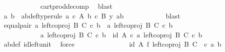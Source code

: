 \begin{isabellebody}
\ \ \ \ \ \ \ \ \ \ \isamarkupfalse%
\ cart{\isacharunderscore}{\kern0pt}prod{\isacharunderscore}{\kern0pt}decomp\ \isamarkupfalse%
\ blast\isanewline
\ \ \ \ \ \ \ \ \isamarkupfalse%
\ \isamarkupfalse%
\ a{\isacharprime}{\kern0pt}\ b{\isacharprime}{\kern0pt}\ \ a{\isacharprime}{\kern0pt}b{\isacharprime}{\kern0pt}{\isacharunderscore}{\kern0pt}def{\isacharbrackleft}{\kern0pt}type{\isacharunderscore}{\kern0pt}rule{\isacharbrackright}{\kern0pt}{\isacharcolon}{\kern0pt}\ {\isachardoublequoteopen}a{\isacharprime}{\kern0pt}\ {\isasymin}\isactrlsub c\ A{\isachardoublequoteclose}\ {\isachardoublequoteopen}b{\isacharprime}{\kern0pt}\ {\isasymin}\isactrlsub c\ B{\isachardoublequoteclose}\ {\isachardoublequoteopen}y{\isacharprime}{\kern0pt}\ {\isacharequal}{\kern0pt}{\isasymlangle}a{\isacharprime}{\kern0pt}{\isacharcomma}{\kern0pt}b{\isacharprime}{\kern0pt}{\isasymrangle}{\isachardoublequoteclose}\isanewline
\ \ \ \ \ \ \ \ \ \ \isamarkupfalse%
\ blast\isanewline
\ \ \ \ \ \ \ \ \isamarkupfalse%
\ equal{\isacharunderscore}{\kern0pt}pair{\isacharcolon}{\kern0pt}\ {\isachardoublequoteopen}{\isasymlangle}a{\isacharcomma}{\kern0pt}\ left{\isacharunderscore}{\kern0pt}coproj\ B\ C\ {\isasymcirc}\isactrlsub c\ b{\isasymrangle}\ {\isacharequal}{\kern0pt}\ {\isasymlangle}a{\isacharprime}{\kern0pt}{\isacharcomma}{\kern0pt}\ left{\isacharunderscore}{\kern0pt}coproj\ B\ C\ {\isasymcirc}\isactrlsub c\ b{\isacharprime}{\kern0pt}{\isasymrangle}{\isachardoublequoteclose}\isanewline
\ \ \ \ \ \ \ \ \isamarkupfalse%
\ {\isacharminus}{\kern0pt}\ \isanewline
\ \ \ \ \ \ \ \ \ \ \isamarkupfalse%
\ {\isachardoublequoteopen}{\isasymlangle}a{\isacharcomma}{\kern0pt}\ left{\isacharunderscore}{\kern0pt}coproj\ B\ C\ {\isasymcirc}\isactrlsub c\ b{\isasymrangle}\ {\isacharequal}{\kern0pt}\ {\isasymlangle}id\ A\ {\isasymcirc}\isactrlsub c\ a{\isacharcomma}{\kern0pt}\ left{\isacharunderscore}{\kern0pt}coproj\ B\ C\ {\isasymcirc}\isactrlsub c\ b{\isasymrangle}{\isachardoublequoteclose}\isanewline
\ \ \ \ \ \ \ \ \ \ \ \ \isamarkupfalse%
\ ab{\isacharunderscore}{\kern0pt}def\ id{\isacharunderscore}{\kern0pt}left{\isacharunderscore}{\kern0pt}unit{}\ \isamarkupfalse%
\ force\isanewline
\ \ \ \ \ \ \ \ \ \ \isamarkupfalse%
\ \isamarkupfalse%
\ {\isachardoublequoteopen}{\isachardot}{\kern0pt}{\isachardot}{\kern0pt}{\isachardot}{\kern0pt}\ {\isacharequal}{\kern0pt}\ {\isacharparenleft}{\kern0pt}id\ A\ {\isasymtimes}\isactrlsub f\ left{\isacharunderscore}{\kern0pt}coproj\ B\ C{\isacharparenright}{\kern0pt}\ \ {\isasymcirc}\isactrlsub c\ {\isasymlangle}a{\isacharcomma}{\kern0pt}\ b{\isasymrangle}{\isachardoublequoteclose}\isanewline

\end{isabellebody}
